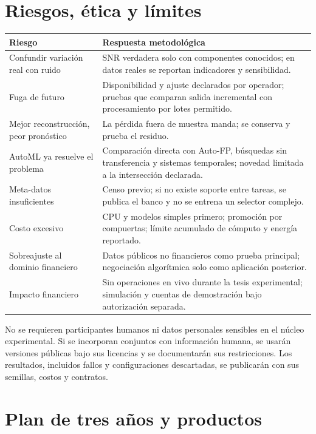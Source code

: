 \documentclass[11pt,letterpaper]{article}
\begin{document}
\section{Riesgos, ética y límites}

\begin{table}[H]
\centering
\begin{tabularx}{\textwidth}{@{}L{4.3cm}Y@{}}
\toprule
\textbf{Riesgo} & \textbf{Respuesta metodológica} \\
\midrule
Confundir variación real con ruido & SNR verdadera solo con componentes conocidos; en datos reales se reportan indicadores y sensibilidad. \\
Fuga de futuro & Disponibilidad y ajuste declarados por operador; pruebas que comparan salida incremental con procesamiento por lotes permitido. \\
Mejor reconstrucción, peor pronóstico & La pérdida fuera de muestra manda; se conserva y prueba el residuo. \\
AutoML ya resuelve el problema & Comparación directa con Auto-FP, búsquedas sin transferencia y sistemas temporales; novedad limitada a la intersección declarada. \\
Meta-datos insuficientes & Censo previo; si no existe soporte entre tareas, se publica el banco y no se entrena un selector complejo. \\
Costo excesivo & CPU y modelos simples primero; promoción por compuertas; límite acumulado de cómputo y energía reportado. \\
Sobreajuste al dominio financiero & Datos públicos no financieros como prueba principal; negociación algorítmica solo como aplicación posterior. \\
Impacto financiero & Sin operaciones en vivo durante la tesis experimental; simulación y cuentas de demostración bajo autorización separada. \\
\bottomrule
\end{tabularx}
\end{table}

No se requieren participantes humanos ni datos personales sensibles en el núcleo experimental.
Si se incorporan conjuntos con información humana, se usarán versiones públicas bajo sus licencias y se documentarán sus restricciones.
Los resultados, incluidos fallos y configuraciones descartadas, se publicarán con sus semillas, costos y contratos.

\section{Plan de tres años y productos}
\end{document}
